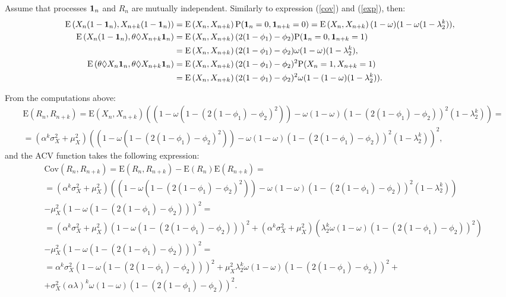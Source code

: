 \documentclass[11pt,a4paper]{article}
\begin{document}
Assume that processes ${\bf 1}_n$ and $R_n$ are mutually independent. Similarly to expression (\ref{cov}) and (\ref{exp}), then:
{\small \begin{align*}
\textrm{E}\left(X_n(1-{\bf 1}_n),X_{n+k}({1-\bf 1}_n)\right)&=\textrm{E}\left(X_n,X_{n+k}\right)\textrm{P}({\bf 1}_n=0,{\bf 1}_{n+k}=0)=\textrm{E}\left(X_n,X_{n+k}\right)(1-\omega)(1-\omega(1-\lambda_2^k)),\\
\textrm{E}\left(X_n(1-{\bf 1}_n),\theta \Diamond X_{n+k}{\bf 1}_n\right)&=\textrm{E}\left(X_n,X_{n+k}\right)(2(1-\phi_1)-\phi_2)\textrm{P}({\bf 1}_n=0,{\bf 1}_{n+k}=1)\\&=\textrm{E}\left(X_n,X_{n+k}\right)(2(1-\phi_1)-\phi_2)\omega(1-\omega)(1-\lambda_2^k),\\
\textrm{E}\left(\theta \Diamond X_n{\bf 1}_n,\theta \Diamond X_{n+k}{\bf 1}_n\right)&=\textrm{E}\left(X_n,X_{n+k}\right)(2(1-\phi_1)-\phi_2)^2\textrm{P}(X_n=1, X_{n+k}=1)\\ &=\textrm{E}\left(X_n,X_{n+k}\right)(2(1-\phi_1)-\phi_2)^2\omega(1-(1-\omega)(1-\lambda_2^k)).
\end{align*}}

\noindent From the computations above:
\begin{align*}
&\textrm{E}(R_n,R_{n+k})=\textrm{E}(X_n,X_{n+k})\left(\left(1-\omega\left(1-(2(1-\phi_1)-\phi_2)^2\right)\right)-\omega(1-\omega)(1-(2(1-\phi_1)-\phi_2))^2(1-\lambda_2^k)\right)=\\&=(\alpha^k\sigma_X^2+\mu_X^2)\left(\left(1-\omega\left(1-(2(1-\phi_1)-\phi_2)^2\right)\right)-\omega(1-\omega)(1-(2(1-\phi_1)-\phi_2))^2(1-\lambda_2^k)\right)^2,
\end{align*}
and the ACV function takes the following expression:
\begin{align*}
&\textrm{Cov}(R_n,R_{n+k})=\textrm{E}(R_n,R_{n+k})-\textrm{E}(R_n)\textrm{E}(R_{n+k})=\\&=(\alpha^k\sigma_X^2+\mu_X^2)\left(\left(1-\omega\left(1-(2(1-\phi_1)-\phi_2)^2\right)\right)-\omega(1-\omega)(1-(2(1-\phi_1)-\phi_2))^2(1-\lambda_2^k)\right)\\ &- \mu_X^2\left(1-\omega\left(1-\left(2(1-\phi_1)-\phi_2\right)\right)\right)^2=\\&=(\alpha^k\sigma_X^2+\mu_X^2)\left(1-\omega\left(1-\left(2(1-\phi_1)-\phi_2\right)\right)\right)^2+(\alpha^k\sigma_X^2+\mu_X^2)\left(\lambda_2^k\omega(1-\omega)(1-\left(2(1-\phi_1)-\phi_2\right))^2\right)\\&-\mu_X^2\left(1-\omega\left(1-\left(2(1-\phi_1)-\phi_2\right)\right)\right)^2=\\&=\alpha^k\sigma_X^2\left(1-\omega\left(1-\left(2(1-\phi_1)-\phi_2\right)\right)\right)^2+\mu_X^2\lambda_2^k\omega(1-\omega)(1-\left(2(1-\phi_1)-\phi_2\right))^2+\\&+\sigma_X^2(\alpha\lambda)^k\omega(1-\omega)(1-\left(2(1-\phi_1)-\phi_2\right))^2. 
\end{align*}
\end{document}
